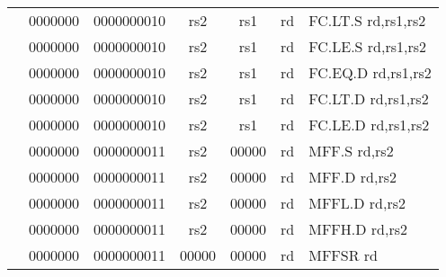 \begin{table}[p]
\begin{small}
\begin{center}
\begin{tabular}{rcccccccccl}
&
\multicolumn{1}{|c|}{0000000} &
\multicolumn{5}{c|}{0000000010} &
\multicolumn{1}{c|}{rs2} &
\multicolumn{1}{c|}{rs1} &
\multicolumn{1}{c|}{rd} & FC.LT.S rd,rs1,rs2 \\
\cline{2-10}
  

&
\multicolumn{1}{|c|}{0000000} &
\multicolumn{5}{c|}{0000000010} &
\multicolumn{1}{c|}{rs2} &
\multicolumn{1}{c|}{rs1} &
\multicolumn{1}{c|}{rd} & FC.LE.S rd,rs1,rs2 \\
\cline{2-10}
  

&
\multicolumn{1}{|c|}{0000000} &
\multicolumn{5}{c|}{0000000010} &
\multicolumn{1}{c|}{rs2} &
\multicolumn{1}{c|}{rs1} &
\multicolumn{1}{c|}{rd} & FC.EQ.D rd,rs1,rs2 \\
\cline{2-10}
  

&
\multicolumn{1}{|c|}{0000000} &
\multicolumn{5}{c|}{0000000010} &
\multicolumn{1}{c|}{rs2} &
\multicolumn{1}{c|}{rs1} &
\multicolumn{1}{c|}{rd} & FC.LT.D rd,rs1,rs2 \\
\cline{2-10}
  

&
\multicolumn{1}{|c|}{0000000} &
\multicolumn{5}{c|}{0000000010} &
\multicolumn{1}{c|}{rs2} &
\multicolumn{1}{c|}{rs1} &
\multicolumn{1}{c|}{rd} & FC.LE.D rd,rs1,rs2 \\
\cline{2-10}
  

&
\multicolumn{1}{|c|}{0000000} &
\multicolumn{5}{c|}{0000000011} &
\multicolumn{1}{c|}{rs2} &
\multicolumn{1}{c|}{00000} &
\multicolumn{1}{c|}{rd} & MFF.S rd,rs2 \\
\cline{2-10}
  

&
\multicolumn{1}{|c|}{0000000} &
\multicolumn{5}{c|}{0000000011} &
\multicolumn{1}{c|}{rs2} &
\multicolumn{1}{c|}{00000} &
\multicolumn{1}{c|}{rd} & MFF.D rd,rs2 \\
\cline{2-10}
  

&
\multicolumn{1}{|c|}{0000000} &
\multicolumn{5}{c|}{0000000011} &
\multicolumn{1}{c|}{rs2} &
\multicolumn{1}{c|}{00000} &
\multicolumn{1}{c|}{rd} & MFFL.D rd,rs2 \\
\cline{2-10}
  

&
\multicolumn{1}{|c|}{0000000} &
\multicolumn{5}{c|}{0000000011} &
\multicolumn{1}{c|}{rs2} &
\multicolumn{1}{c|}{00000} &
\multicolumn{1}{c|}{rd} & MFFH.D rd,rs2 \\
\cline{2-10}
  

&
\multicolumn{1}{|c|}{0000000} &
\multicolumn{5}{c|}{0000000011} &
\multicolumn{1}{c|}{00000} &
\multicolumn{1}{c|}{00000} &
\multicolumn{1}{c|}{rd} & MFFSR rd \\
\cline{2-10}
  


\end{tabular}
\end{center}
\end{small}
\end{table}
